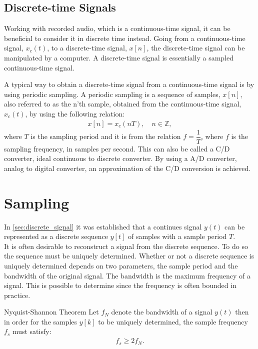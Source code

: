 \subsection{Discrete-time Signals} 
Working with recorded audio, which is a continuous-time signal, it can be beneficial to consider it in discrete time instead.
Going from a continuous-time signal, $x_c(t)$, to a discrete-time signal, $x[n]$, the discrete-time signal can be manipulated by a computer. A discrete-time signal is essentially a sampled continuous-time signal.

A typical way to obtain a discrete-time signal from a continuous-time signal is by using periodic sampling. A periodic sampling is a sequence of samples, $x[n]$, also referred to as the n'th sample, obtained from the continuous-time signal, $x_c(t)$, by using the following relation:
\begin{align*}
x[n]=x_c (nT), \quad   n \in \mathbb{Z},
\end{align*}
where $T$ is the sampling period and it is from the relation $f=\dfrac{1}{T}$, where $f$ is the sampling frequency, in samples per second. This can also be called a C/D converter, ideal continuous to discrete converter. 
By using a A/D converter, analog to digital converter, an approximation of the C/D conversion is achieved. \cite[p. 140-142]{DiscreteTimeSignal}\\

\section{Sampling}



In \autoref{sec:discrete_signal} it was established that a continues signal $y(t)$ can be represented as a discrete sequence $y[t]$ of samples with a sample period $T$.\\
It is often desirable to reconstruct a signal from the discrete sequence. To do so the sequence must be uniquely determined. Whether or not a discrete sequence is uniquely determined depends on two parameters, the sample period and the bandwidth of the original signal. The bandwidth is the maximum frequency of a signal. This is possible to determine since the frequency is often bounded in practice.   

\begin{theorem}{Nyquist-Shannon Theorem}
    \label{the:Nyquist-Shannon}
    Let $f_N$ denote the bandwidth of a signal $y(t)$ then in order for the samples $y[k]$ to be uniquely determined, the sample frequency $f_s$ must satisfy:
    \begin{align*}
        f_s \geq 2f_N.
    \end{align*}
    \cite[397]{mandal2007continuous}
\end{theorem}

